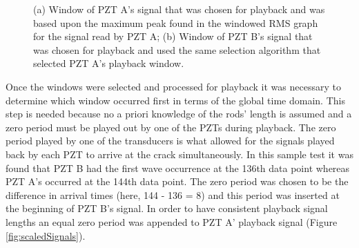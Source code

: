 \begin{figure}
\begin{subfigmatrix}{2}
\end{subfigmatrix}

  \caption
  { \label{fig:chosenSignals}
(a) Window of PZT A's signal that was chosen for playback and was based upon the maximum peak found in the windowed RMS graph for the signal read by PZT A;
(b) Window of PZT B's signal that was chosen for playback and used the same selection algorithm that selected PZT A's playback window.
}
\end{figure}

Once the windows were selected and processed for playback it was necessary to determine which window occurred first in terms of the global time domain. This step is needed because no a priori knowledge of the rods' length is assumed and a zero period must be played out by one of the PZTs during playback. The zero period played by one of the transducers is what allowed for the signals played back by each PZT to arrive at the crack simultaneously. In this sample test it was found that PZT B had the first wave occurrence at the 136th data point whereas PZT A's occurred at the 144th data point.  The zero period was chosen to be the difference in arrival times (here, 144 - 136 = 8) and this period was inserted at the beginning of PZT B's signal. In order to have consistent playback signal lengths an equal zero period was appended to PZT A' playback signal (Figure \ref{fig:scaledSignals}).


